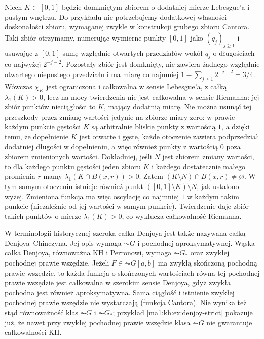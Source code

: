 \begin{przyklad}\label{ma1:kh:ex:fat-cantor-no-riemann}
Niech $K\subset[0,1]$ będzie domkniętym zbiorem o dodatniej mierze Lebesgue'a
i pustym wnętrzu. Do przykładu nie potrzebujemy
dodatkowej własności doskonałości zbioru, wymaganej
zwykle w konstrukcji grubego zbioru Cantora. Taki zbiór otrzymamy, numerując wymierne punkty $[0,1]$ jako $(q_j)_{j\ge1}$ i usuwając z $[0,1]$ sumę względnie otwartych przedziałów wokół $q_j$ o długościach co najwyżej $2^{-j-2}$. Pozostały zbiór jest domknięty, nie zawiera żadnego względnie otwartego niepustego przedziału i ma miarę co najmniej $1-\sum_{j\ge1}2^{-j-2}=3/4$. Wówczas $\chi_K$ jest ograniczona i całkowalna w sensie Lebesgue'a, z całką $\lambda_1(K)>0$, lecz na mocy twierdzenia  nie jest całkowalna w sensie Riemanna: jej zbiór punktów nieciągłości to $K$, mający dodatnią miarę. Nie można usunąć tej przeszkody przez zmianę wartości jedynie na zbiorze miary zero: w prawie każdym punkcie gęstości $K$ są arbitralnie bliskie punkty z wartością $1$, a dzięki temu, że dopełnienie $K$ jest otwarte i gęste, każde otoczenie zawiera podprzedział dodatniej długości w dopełnieniu, a więc również punkty z wartością $0$ poza zbiorem zmienionych wartości. Dokładniej, jeśli $N$ jest zbiorem zmiany wartości, to dla każdego punktu gęstości jeden zbioru $K$ i każdego dostatecznie małego promienia $r$ mamy $\lambda_1(K\cap B(x,r))>0$. Zatem $(K\setminus N)\cap B(x,r)\ne\varnothing$. W tym samym otoczeniu istnieje również punkt $( [0,1]\setminus K)\setminus N$, jak ustalono wyżej. Zmieniona funkcja ma więc oscylację co najmniej $1$ w każdym takim punkcie (niezależnie od jej wartości w samym punkcie). Twierdzenie  daje zbiór takich punktów o mierze $\lambda_1(K)>0$, co wyklucza całkowalność Riemanna.
\end{przyklad}

\begin{uwaga}
W terminologii historycznej szeroka całka Denjoya jest także nazywana całką Denjoya--Chinczyna. Jej opis wymaga $\AC G$ i pochodnej aproksymatywnej. Wąska całka Denjoya, równoważna KH i Perronowi, wymaga $\AC G_*$ oraz zwykłej pochodnej prawie wszędzie. Jeżeli $F\in\AC G[a,b]$ ma zwykłą skończoną pochodną prawie wszędzie, to każda funkcja o skończonych wartościach równa tej pochodnej prawie wszędzie jest całkowalna w szerokim sensie Denjoya, gdyż zwykła pochodna jest również aproksymatywna. Sama ciągłość i istnienie zwykłej pochodnej prawie wszędzie nie wystarczają (funkcja Cantora). Nie wynika też stąd równoważność klas $\AC G$ i $\AC G_*$; przykład \ref{ma1:kh:ex:denjoy-strict} pokazuje już, że nawet przy zwykłej pochodnej prawie wszędzie klasa $\AC G$ nie gwarantuje całkowalności KH.
\end{uwaga}
\endgroup
